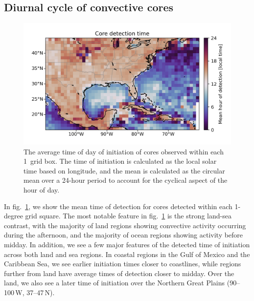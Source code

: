
\subsection{Diurnal cycle of convective cores}

\begin{figure}[tp]
    \centering
    \includegraphics[width=\textwidth]{figures/chapter2_11.png}
    \caption[
    A map of average time of day of initiation of detected cores
    ]{
    The average time of day of initiation of cores observed within each 1\textdegree\ grid box. The time of initiation is calculated as the local solar time based on longitude, and the mean is calculated as the circular mean over a 24-hour period to account for the cyclical aspect of the hour of day.
    }
    \label{fig:core_detection_time_map}
\end{figure}

In fig.~\ref{fig:core_detection_time_map}, we show the mean time of detection for cores detected within each 1-degree grid square.
The most notable feature in fig.~\ref{fig:core_detection_time_map} is the strong land-sea contrast, with the majority of land regions showing convective activity occurring during the afternoon, and the majority of ocean regions showing activity before midday.
In addition, we see a few major features of the detected time of initiation across both land and sea regions.
In coastal regions in the Gulf of Mexico and the Caribbean Sea, we see earlier initiation times closer to coastlines, while regions further from land have average times of detection closer to midday.
Over the land, we also see a later time of initiation over the Northern Great Plains (90--100\,\textdegree W, 37--47\,\textdegree N).

